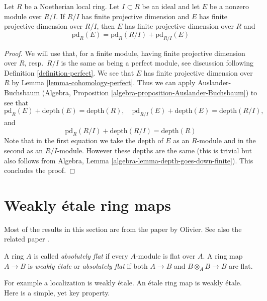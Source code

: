 \begin{lemma}
\label{lemma-additivity-of-pd}
Let $R$ be a Noetherian local ring. Let $I \subset R$ be an ideal
and let $E$ be a nonzero module over $R/I$. If $R/I$ has finite projective
dimension and $E$ has finite projective dimension over $R/I$, then
$E$ has finite projective dimension over $R$ and
$$
\text{pd}_R(E) = \text{pd}_R(R/I) + \text{pd}_{R/I}(E)
$$
\end{lemma}

\begin{proof}
We will use that, for a finite module, having finite projective dimension
over $R$, resp.\ $R/I$ is the same as being a perfect module, see
discussion following Definition \ref{definition-perfect}.
We see that $E$ has finite projective dimension
over $R$ by Lemma \ref{lemma-cohomology-perfect}.
Thus we can apply Auslander-Buchsbaum (Algebra, Proposition
\ref{algebra-proposition-Auslander-Buchsbaum}) to see that
$$
\text{pd}_R(E) + \text{depth}(E) = \text{depth}(R),\quad
\text{pd}_{R/I}(E) + \text{depth}(E) = \text{depth}(R/I),
$$
and
$$
\text{pd}_R(R/I) + \text{depth}(R/I) = \text{depth}(R)
$$
Note that in the first equation we take the depth of $E$
as an $R$-module and in the second as an $R/I$-module.
However these depths are the same (this is trivial but
also follows from Algebra, Lemma \ref{algebra-lemma-depth-goes-down-finite}).
This concludes the proof.
\end{proof}





\section{Weakly \'etale ring maps}
\label{section-weakly-etale}

\noindent
Most of the results in this section are from the paper
\cite{Olivier-AF} by Olivier. See also the related paper
\cite{Ferrand-epi}.

\begin{definition}
\label{definition-weakly-etale}
A ring $A$ is called {\it absolutely flat} if every $A$-module is flat over
$A$. A ring map $A \to B$ is {\it weakly \'etale} or {\it absolutely flat}
if both $A \to B$ and $B \otimes_A B \to B$ are flat.
\end{definition}

\noindent
For example a localization is weakly \'etale. An \'etale ring map is weakly
\'etale. Here is a simple, yet key property.

